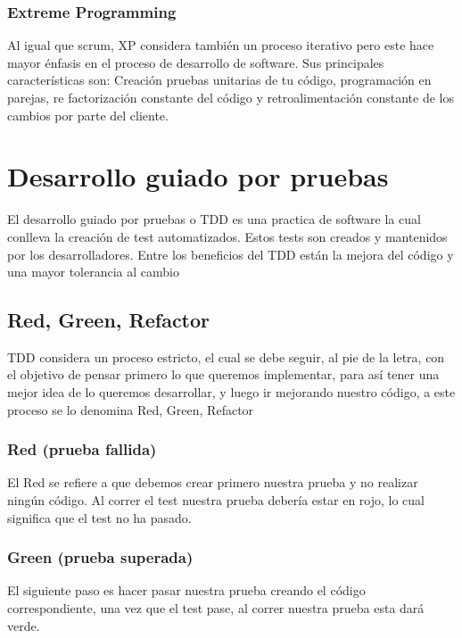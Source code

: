 \subsubsection{Extreme Programming}

Al igual que scrum, XP considera también un proceso iterativo pero este
hace mayor énfasis en el proceso de desarrollo de software. Sus principales
características son: Creación pruebas unitarias de tu código, programación
en parejas, re factorización constante del código y retroalimentación
constante de los cambios por parte del cliente.

\section{Desarrollo guiado por pruebas}

El desarrollo guiado por pruebas o TDD es una practica de software la
cual conlleva la creación de test automatizados. Estos tests son
creados y mantenidos por los desarrolladores. Entre los beneficios
del TDD están la mejora del código y una mayor tolerancia al cambio

\subsection{Red, Green, Refactor}

TDD considera un proceso estricto, el cual se debe
seguir, al pie de la letra, con el objetivo de pensar primero lo que queremos
implementar, para así tener una mejor idea de lo queremos desarrollar, y luego
ir mejorando nuestro código, a este proceso se lo denomina Red, Green, Refactor

\subsubsection{Red (prueba fallida)}

El Red se refiere a que debemos crear primero nuestra prueba y no realizar
ningún código. Al correr el test nuestra prueba debería estar en rojo, lo cual
significa que el test no ha pasado.

\subsubsection{Green (prueba superada)}

El siguiente paso es hacer pasar nuestra prueba creando el código
correspondiente, una vez que el test pase, al correr nuestra prueba esta dará
verde.

